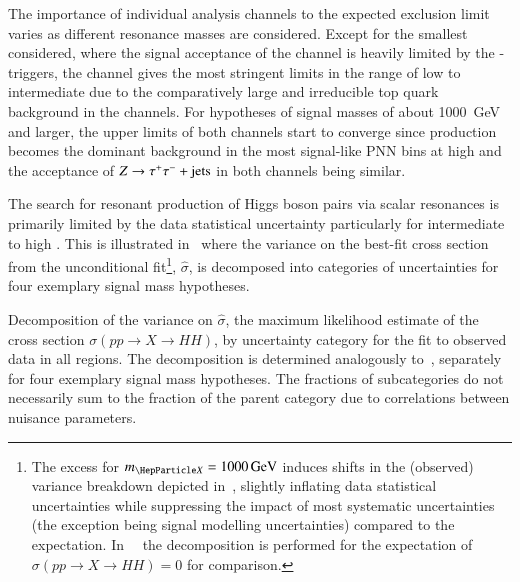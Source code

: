 The importance of individual analysis channels to the expected
exclusion limit varies as different resonance masses are
considered. Except for the smallest \mX considered, where the signal
acceptance of the \hadhad channel is heavily limited by the
\tauhadvis-triggers, the \hadhad channel gives the most stringent
limits in the range of low to intermediate \mX due to the
comparatively large and irreducible top quark background in the
\lephad channels. For hypotheses of signal masses of about
\SI{1000}{\GeV} and larger, the upper limits of both channels start to
converge since \Zjets production becomes the dominant background in
the most signal-like PNN bins at high \mX and the acceptance of
$Z \to \tau^{+} \tau^{-} + \text{jets}$ in both channels being
similar.

The search for resonant production of Higgs boson pairs via scalar
resonances is primarily limited by the data statistical uncertainty
particularly for intermediate to high \mX. This is illustrated
in~ where the variance on the best-fit cross
section from the unconditional fit\footnote{The excess for
  $\mX = \SI{1000}{\GeV}$ induces shifts in the (observed) variance
  breakdown depicted in~, slightly inflating
  data statistical uncertainties while suppressing the impact of most
  systematic uncertainties (the exception being signal modelling
  uncertainties) compared to the
  expectation. In~~
  the decomposition is performed for the expectation of
  $\sigma(pp \to X \to HH) = 0$ for comparison.}, $\hat{\sigma}$, is
decomposed into categories of uncertainties for four exemplary signal
mass hypotheses.

\begin{table}[htbp]
  \centering

  \caption{Decomposition of the variance on $\hat{\sigma}$, the
    maximum likelihood estimate of the cross section
    $\sigma(pp \to X\to HH)$, by uncertainty category for the fit to
    observed data in all regions. The decomposition is determined
    analogously to~, separately for four
    exemplary signal mass hypotheses. The fractions of subcategories
    do not necessarily sum to the fraction of the parent category due
    to correlations between nuisance parameters.}%
  \label{tab:breakdown_res}

  

\end{table}

